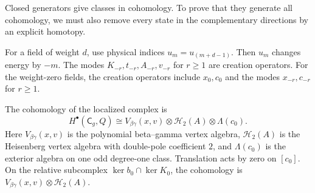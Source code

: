 Closed generators give classes in cohomology.
To prove that they generate all cohomology, we must also remove every state in the complementary directions by an explicit homotopy.

For a field of weight $d$, use physical indices $u_m=u_{(m+d-1)}$.
Then $u_m$ changes energy by $-m$.
The modes $K_{-r},t_{-r},A_{-r},v_{-r}$ for $r\geq1$ are creation operators.
For the weight-zero fields, the creation operators include $x_0,c_0$ and the modes $x_{-r},c_{-r}$ for $r\geq1$.

\begin{theorem}\label{thm:cc-brst-cohomology}
The cohomology of the localized complex is
\[
 H^\bullet(\mathsf C_g,Q)
 \cong V_{\beta\gamma}(x,v)\otimes\mathcal H_2(A)\otimes\Lambda(c_0).
\]
Here $V_{\beta\gamma}(x,v)$ is the polynomial beta--gamma vertex algebra,
$\mathcal H_2(A)$ is the Heisenberg vertex algebra with double-pole coefficient $2$,
and $\Lambda(c_0)$ is the exterior algebra on one odd degree-one class.
Translation acts by zero on $[c_0]$.
On the relative subcomplex $\ker b_0\cap\ker K_0$, the cohomology is
$V_{\beta\gamma}(x,v)\otimes\mathcal H_2(A)$.
\end{theorem}
